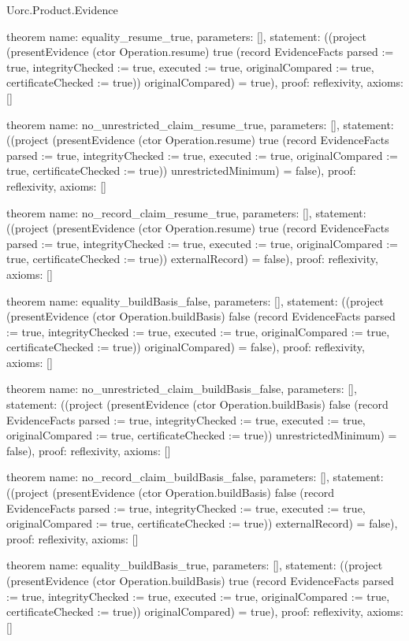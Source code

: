 \begin{lexlean}{Uorc.Product.Evidence}
\begin{semanticmodule}
theorem{
  name: equality_resume_true,
  parameters: [],
  statement: ((project (presentEvidence (ctor Operation.resume) true (record EvidenceFacts {parsed := true, integrityChecked := true, executed := true, originalCompared := true, certificateChecked := true})) originalCompared) = true),
  proof: reflexivity{},
  axioms: []
}

theorem{
  name: no_unrestricted_claim_resume_true,
  parameters: [],
  statement: ((project (presentEvidence (ctor Operation.resume) true (record EvidenceFacts {parsed := true, integrityChecked := true, executed := true, originalCompared := true, certificateChecked := true})) unrestrictedMinimum) = false),
  proof: reflexivity{},
  axioms: []
}

theorem{
  name: no_record_claim_resume_true,
  parameters: [],
  statement: ((project (presentEvidence (ctor Operation.resume) true (record EvidenceFacts {parsed := true, integrityChecked := true, executed := true, originalCompared := true, certificateChecked := true})) externalRecord) = false),
  proof: reflexivity{},
  axioms: []
}

theorem{
  name: equality_buildBasis_false,
  parameters: [],
  statement: ((project (presentEvidence (ctor Operation.buildBasis) false (record EvidenceFacts {parsed := true, integrityChecked := true, executed := true, originalCompared := true, certificateChecked := true})) originalCompared) = false),
  proof: reflexivity{},
  axioms: []
}

theorem{
  name: no_unrestricted_claim_buildBasis_false,
  parameters: [],
  statement: ((project (presentEvidence (ctor Operation.buildBasis) false (record EvidenceFacts {parsed := true, integrityChecked := true, executed := true, originalCompared := true, certificateChecked := true})) unrestrictedMinimum) = false),
  proof: reflexivity{},
  axioms: []
}

theorem{
  name: no_record_claim_buildBasis_false,
  parameters: [],
  statement: ((project (presentEvidence (ctor Operation.buildBasis) false (record EvidenceFacts {parsed := true, integrityChecked := true, executed := true, originalCompared := true, certificateChecked := true})) externalRecord) = false),
  proof: reflexivity{},
  axioms: []
}

theorem{
  name: equality_buildBasis_true,
  parameters: [],
  statement: ((project (presentEvidence (ctor Operation.buildBasis) true (record EvidenceFacts {parsed := true, integrityChecked := true, executed := true, originalCompared := true, certificateChecked := true})) originalCompared) = true),
  proof: reflexivity{},
  axioms: []
}


\end{semanticmodule}
\end{lexlean}
